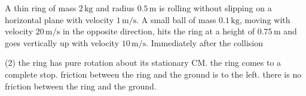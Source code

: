 
\item A thin ring of mass \(2 \, \text{kg}\) and radius \(0.5 \, \text{m}\) is rolling without slipping on a horizontal plane with velocity \(1 \, \text{m/s}\). A small ball of mass \(0.1 \, \text{kg}\), moving with velocity \(20 \, \text{m/s}\) in the opposite direction, hits the ring at a height of \(0.75 \, \text{m}\) and goes vertically up with velocity \(10 \, \text{m/s}\). Immediately after the collision
    \begin{center}
    \end{center}
    \begin{tasks}(2)
        \task the ring has pure rotation about its stationary CM.
        \task the ring comes to a complete stop.
        \task friction between the ring and the ground is to the left.
        \task there is no friction between the ring and the ground.
    \end{tasks}
